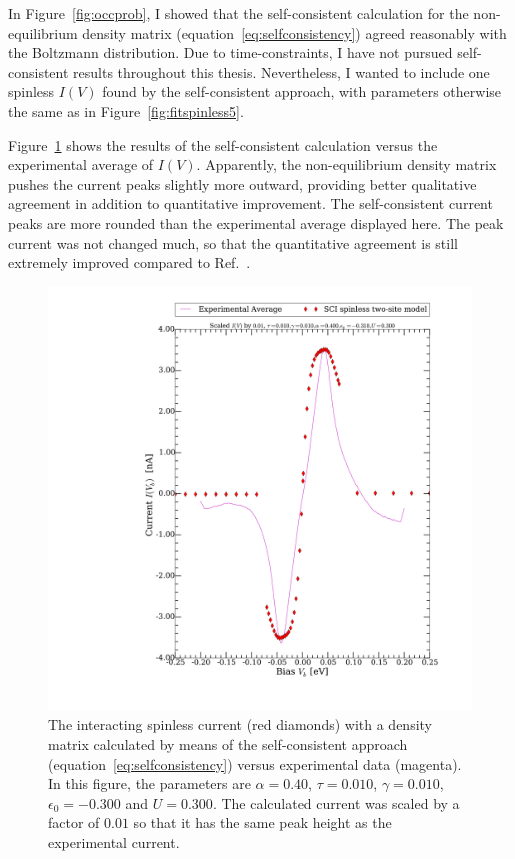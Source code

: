 In Figure~\ref{fig:occprob}, I showed that the self-consistent calculation for the non-equilibrium density matrix (equation~\ref{eq:selfconsistency}) agreed reasonably with the Boltzmann distribution. Due to time-constraints, I have not pursued self-consistent results throughout this thesis. Nevertheless, I wanted to include one spinless $I(V)$ found by the self-consistent approach, with parameters otherwise the same as in Figure~\ref{fig:fitspinless5}.

Figure~\ref{fig:figselfconsistent} shows the results of the self-consistent calculation versus the experimental average of $I(V)$. Apparently, the non-equilibrium density matrix pushes the current peaks slightly more outward, providing better qualitative agreement in addition to quantitative improvement.
The self-consistent current peaks are more rounded than the experimental average displayed here. The peak current was not changed much, so that the quantitative agreement is still extremely improved compared to Ref.~\cite{perrinnano}.


\begin{figure}[htb]
    \centering
    \includegraphics[width=.95\textwidth, clip=true, trim=11cm 2cm 2cm 0cm]{pdf/selfconsistentwow.pdf}
    \caption{The interacting spinless current (red diamonds) with a density matrix calculated by means of the self-consistent approach (equation~\ref{eq:selfconsistency}) versus experimental data (magenta). In this figure, the parameters are $\alpha=0.40$, $\tau=0.010$, $\gamma=0.010$, $\epsilon_0=-0.300$ and $U=0.300$. The calculated current was scaled by a factor of $0.01$ so that it has the same peak height as the experimental current.  }  
    \label{fig:figselfconsistent}
\end{figure} 
\clearpage
{}
